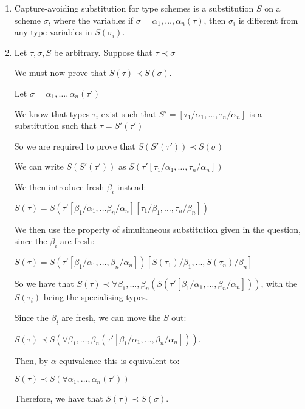 \documentclass[12pt]{article}
\begin{document}
\begin{enumerate}[label=(\alph*)]
  \item
    Capture-avoiding substitution for type schemes is a substitution $S$ on a scheme $\sigma$, where the variables if $\sigma = \alpha_1, \ldots, \alpha_n(\tau)$, then $\sigma_i$ is different from any type variables in $S(\sigma_i)$.

  \item
    Let $\tau, \sigma, S$ be arbitrary. Suppose that $\tau \prec \sigma$

    We must now prove that $S(\tau) \prec S(\sigma)$.

    Let $\sigma = \alpha_1, \ldots, \alpha_n (\tau')$

    We know that types $\tau_i$ exist such that $S' = [\tau_1 / \alpha_1, \ldots, \tau_n / \alpha_n]$ is a substitution such that $\tau = S'(\tau')$

    So we are required to prove that $S(S'(\tau')) \prec S(\sigma)$

    We can write $S(S'(\tau'))$ as $S(\tau'[\tau_1 / \alpha_1 ,\ldots, \tau_n / \alpha_n])$

    We then introduce fresh $\beta_i$ instead:

    $S(\tau) = S(\tau'[\beta_1 / \alpha_1, \ldots \beta_n / \alpha_n][\tau_1 / \beta_1, \ldots, \tau_n / \beta_n])$

    We then use the property of simultaneous substitution given in the question, since the $\beta_i$ are fresh:

    $S(\tau) = S(\tau'[\beta_1 / \alpha_1, \ldots, \beta_n / \alpha_n])[S(\tau_1) / \beta_1, \ldots, S(\tau_n) / \beta_n]$

    So we have that $S(\tau) \prec \forall \beta_1, \ldots, \beta_n (S(\tau'[\beta_1 / \alpha_1, \ldots, \beta_n / \alpha_n]))$, with the $S(\tau_i)$ being the specialising types.

    Since the $\beta_i$ are fresh, we can move the $S$ out:

    $S(\tau) \prec S(\forall \beta_1, \ldots, \beta_n (\tau'[\beta_1 / \alpha_1, \ldots, \beta_n / \alpha_n]))$.

    Then, by $\alpha$ equivalence this is equivalent to:

    $S(\tau) \prec S(\forall \alpha_1, \ldots, \alpha_n(\tau'))$

    Therefore, we have that $S(\tau) \prec S(\sigma)$.







        
\end{enumerate}
\end{document}
